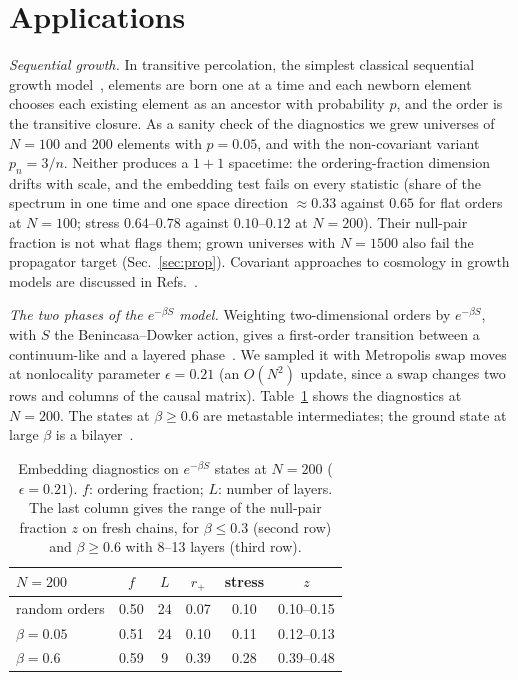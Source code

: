 \documentclass[prd,twocolumn,superscriptaddress,nofootinbib,amsmath,amssymb,floatfix]{revtex4-2}
\begin{document}
\section{Applications}\label{sec:phases}
\emph{Sequential growth.} In transitive percolation, the simplest classical sequential growth model~\cite{RideoutSorkin00}, elements are born one at a time and each newborn element chooses each existing element as an ancestor with probability $p$, and the order is the transitive closure. As a sanity check of the diagnostics we grew universes of $N=100$ and $200$ elements with $p=0.05$, and with the non-covariant variant $p_n=3/n$. Neither produces a $1+1$ spacetime: the ordering-fraction dimension drifts with scale, and the embedding test fails on every statistic (share of the spectrum in one time and one space direction $\approx0.33$ against $0.65$ for flat orders at $N=100$; stress $0.64$--$0.78$ against $0.10$--$0.12$ at $N=200$). Their null-pair fraction is not what flags them; grown universes with $N=1500$ also fail the propagator target (Sec.~\ref{sec:prop}). Covariant approaches to cosmology in growth models are discussed in Refs.~\cite{MORS01,AhmedRideout10}.

\emph{The two phases of the $e^{-\beta S}$ model.} Weighting two-dimensional orders by $e^{-\beta S}$, with $S$ the Benincasa--Dowker action, gives a first-order transition between a continuum-like and a layered phase~\cite{BHS08,Surya12,GOS18}. We sampled it with Metropolis swap moves at nonlocality parameter $\epsilon=0.21$ (an $O(N^2)$ update, since a swap changes two rows and columns of the causal matrix). Table~\ref{tab:phases} shows the diagnostics at $N=200$. The states at $\beta\geq0.6$ are metastable intermediates; the ground state at large $\beta$ is a bilayer~\cite{CunninghamSurya19}.

\begin{table}[t]
\caption{Embedding diagnostics on $e^{-\beta S}$ states at $N=200$ ($\epsilon=0.21$). $f$: ordering fraction; $L$: number of layers. The last column gives the range of the null-pair fraction $z$ on fresh chains, for $\beta\le0.3$ (second row) and $\beta\ge0.6$ with 8--13 layers (third row).}
\label{tab:phases}
\begin{ruledtabular}
\begin{tabular}{lccccc}
$N=200$ & $f$ & $L$ & $r_+$ & stress & $z$\\
\hline
random orders & 0.50 & 24 & 0.07 & 0.10 & 0.10--0.15\\
$\beta=0.05$ & 0.51 & 24 & 0.10 & 0.11 & 0.12--0.13\\
$\beta=0.6$ & 0.59 & 9 & 0.39 & 0.28 & 0.39--0.48\\
\end{tabular}
\end{ruledtabular}
\end{table}
\end{document}
